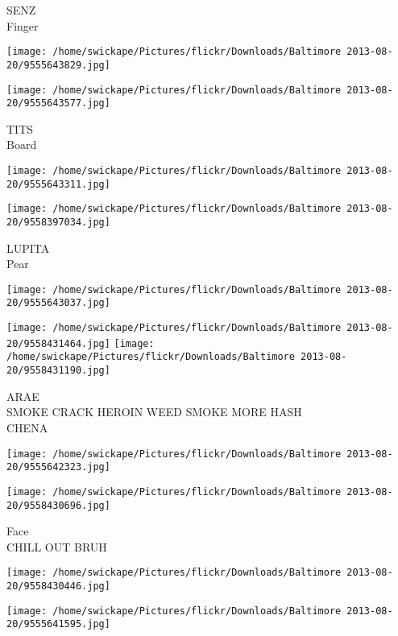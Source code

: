 \documentclass[10pt,letterpaper]{article}
\begin{document}
SENZ\\
Finger\\
\pagebreak

\texttt{[image: /home/swickape/Pictures/flickr/Downloads/Baltimore 2013-08-20/9555643829.jpg]}

\vspace{0.25in}
\texttt{[image: /home/swickape/Pictures/flickr/Downloads/Baltimore 2013-08-20/9555643577.jpg]}

TITS\\
Board\\
\pagebreak

\texttt{[image: /home/swickape/Pictures/flickr/Downloads/Baltimore 2013-08-20/9555643311.jpg]}

\vspace{0.25in}
\texttt{[image: /home/swickape/Pictures/flickr/Downloads/Baltimore 2013-08-20/9558397034.jpg]}

LUPITA\\
Pear\\
\pagebreak

\texttt{[image: /home/swickape/Pictures/flickr/Downloads/Baltimore 2013-08-20/9555643037.jpg]}

\vspace{0.25in}
\texttt{[image: /home/swickape/Pictures/flickr/Downloads/Baltimore 2013-08-20/9558431464.jpg]}
\texttt{[image: /home/swickape/Pictures/flickr/Downloads/Baltimore 2013-08-20/9558431190.jpg]}

ARAE\\
SMOKE CRACK HEROIN WEED SMOKE MORE HASH\\
CHENA\\
\pagebreak

\texttt{[image: /home/swickape/Pictures/flickr/Downloads/Baltimore 2013-08-20/9555642323.jpg]}

\vspace{0.25in}
\texttt{[image: /home/swickape/Pictures/flickr/Downloads/Baltimore 2013-08-20/9558430696.jpg]}

Face\\
CHILL OUT BRUH\\
\pagebreak

\texttt{[image: /home/swickape/Pictures/flickr/Downloads/Baltimore 2013-08-20/9558430446.jpg]}

\vspace{0.25in}
\texttt{[image: /home/swickape/Pictures/flickr/Downloads/Baltimore 2013-08-20/9555641595.jpg]}
\end{document}
